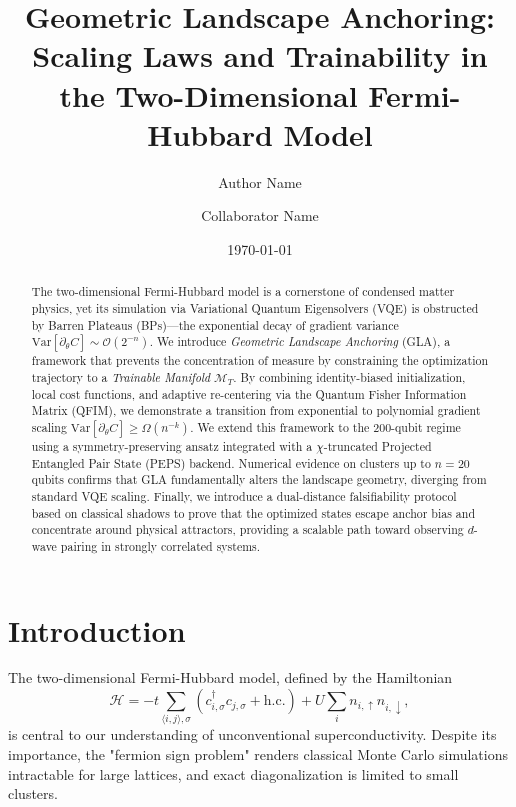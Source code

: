 \documentclass[aps,prx,reprint,superscriptaddress,amsmath,amssymb]{revtex4-2}
\newcommand{\Var}{\mathrm{Var}}
\newcommand{\McalT}{\mathcal{M}_T}
\newcommand{\Hamiltonian}{\mathcal{H}}
\begin{document}
\title{Geometric Landscape Anchoring: Scaling Laws and Trainability in the Two-Dimensional Fermi-Hubbard Model}

\author{Author Name}
\author{Collaborator Name}

\date{\today}

\begin{abstract}
The two-dimensional Fermi-Hubbard model is a cornerstone of condensed matter physics, yet its simulation via Variational Quantum Eigensolvers (VQE) is obstructed by Barren Plateaus (BPs)---the exponential decay of gradient variance $\Var[\partial_\theta C] \sim \mathcal{O}(2^{-n})$. We introduce \textit{Geometric Landscape Anchoring} (GLA), a framework that prevents the concentration of measure by constraining the optimization trajectory to a \textit{Trainable Manifold} $\McalT$. By combining identity-biased initialization, local cost functions, and adaptive re-centering via the Quantum Fisher Information Matrix (QFIM), we demonstrate a transition from exponential to polynomial gradient scaling $\Var[\partial_\theta C] \ge \Omega(n^{-k})$. We extend this framework to the $200$-qubit regime using a symmetry-preserving ansatz integrated with a $\chi$-truncated Projected Entangled Pair State (PEPS) backend. Numerical evidence on clusters up to $n=20$ qubits confirms that GLA fundamentally alters the landscape geometry, diverging from standard VQE scaling. Finally, we introduce a dual-distance falsifiability protocol based on classical shadows to prove that the optimized states escape anchor bias and concentrate around physical attractors, providing a scalable path toward observing $d$-wave pairing in strongly correlated systems.
\end{abstract}

\maketitle

\section{Introduction}
The two-dimensional Fermi-Hubbard model, defined by the Hamiltonian
\begin{equation}
\Hamiltonian = -t \sum_{\langle i,j \rangle, \sigma} \left( c^\dagger_{i,\sigma} c_{j,\sigma} + \mathrm{h.c.} \right) + U \sum_i n_{i,\uparrow} n_{i,\downarrow},
\end{equation}
is central to our understanding of unconventional superconductivity. Despite its importance, the "fermion sign problem" renders classical Monte Carlo simulations intractable for large lattices, and exact diagonalization is limited to small clusters.
\end{document}
